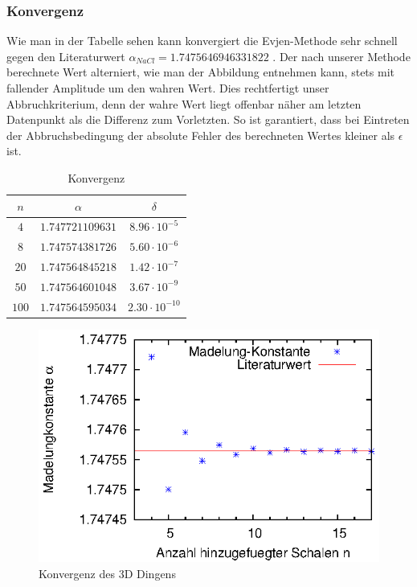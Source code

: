 \documentclass[10pt,a4paper]{article}
\begin{document}
\subsubsection{Konvergenz}
\label{sssec:Konvergenz}

Wie man in der Tabelle sehen kann konvergiert die Evjen-Methode sehr schnell
gegen den Literaturwert $\alpha_{NaCl} = 1.7475646946331822$ \cite{Sakamoto}.
Der nach unserer Methode berechnete Wert alterniert, wie man der Abbildung
entnehmen kann, stets mit fallender Amplitude um den wahren Wert. Dies
rechtfertigt unser Abbruchkriterium, denn der wahre Wert liegt offenbar
näher am letzten Datenpunkt als die Differenz zum Vorletzten. So ist garantiert,
dass bei Eintreten der Abbruchsbedingung der absolute Fehler des berechneten
Wertes kleiner als $\epsilon$ ist.

\begin{table}[h]
\centering
\begin{tabular}{c|c|c}
\rule[-1ex]{0pt}{2.5ex} $n$ & $\alpha$ & $\delta$ \\ 
\hline 
\rule[-1ex]{0pt}{2.5ex} $4$ & $1.747721109631$ & $8.96\cdot10^{-5}$ \\ 
\hline 
\rule[-1ex]{0pt}{2.5ex} $8$ & $1.747574381726$ & $5.60\cdot10^{-6}$ \\ 
\hline 
\rule[-1ex]{0pt}{2.5ex} $20$ & $1.747564845218$ & $1.42\cdot10^{-7}$ \\ 
\hline 
\rule[-1ex]{0pt}{2.5ex} $50$ & $1.747564601048$ & $3.67\cdot10^{-9}$ \\ 
\hline 
\rule[-1ex]{0pt}{2.5ex} $100$ & $1.747564595034$ & $2.30\cdot10^{-10}$ \\ 
\end{tabular} 
\caption{Konvergenz}
\end{table}

\begin{figure}[h]
	\centering
	\includegraphics[scale = 1]{./figures/ergebnis.eps}
	\caption{Konvergenz des 3D Dingens}
	\label{plotkonvergenz3d}
\end{figure}
\end{document}
